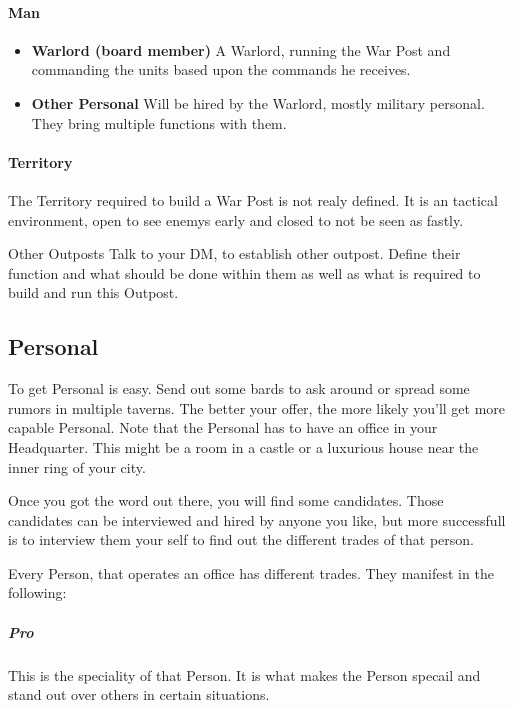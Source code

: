 \documentclass[10pt,twoside,twocolumn,openany]{book}
\begin{document}
\paragraph{Man}
\begin{itemize}
\item \textbf{Warlord (board member)} A Warlord, running the War Post and commanding the units based upon the commands he receives.
\item \textbf{Other Personal} Will be hired by the Warlord, mostly military personal. They bring multiple functions with them.
\end{itemize}

\paragraph{Territory}

The Territory required to build a War Post is not realy defined. It is an tactical environment, open to see enemys early and closed to not be seen as fastly.

\begin{commentbox}{Other Outposts}
Talk to your DM, to establish other outpost. Define their function and what should be done within them as well as what is required to build and run this Outpost.
\end{commentbox}

\subsection{Personal}

To get Personal is easy. Send out some bards to ask around or spread some rumors in multiple taverns. The better your offer, the more likely you'll get more capable Personal. Note that the Personal has to have an office in your Headquarter. This might be a room in a castle or a luxurious house near the inner ring of your city.

Once you got the word out there, you will find some candidates. Those candidates can be interviewed and hired by anyone you like, but more successfull is to interview them your self to find out the different trades of that person.

Every Person, that operates an office has different trades. They manifest in the following:

\subparagraph{Pro} This is the speciality of that Person. It is what makes the Person specail and stand out over others in certain situations.
\end{document}
